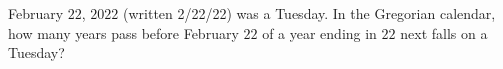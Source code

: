 February $22$, $2022$ (written 2/22/22) was a Tuesday. In the Gregorian calendar, how many years pass before February $22$ of a year ending in $22$ next falls on a Tuesday?
